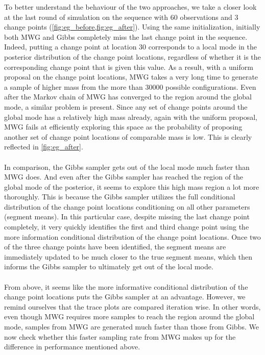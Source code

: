 To better understand the behaviour of the two approaches, we take a closer look at the last round of simulation on the sequence with $60$ observations and $3$ change points (\cref{fig:eg_before,fig:eg_after}). Using the same initialization, initially both MWG and Gibbs completely miss the last change point in the sequence. Indeed, putting a change point at location $30$ corresponds to a local mode in the posterior distribution of the change point locations, regardless of whether it is the corresponding change point that is given this value. As a result, with a uniform proposal on the change point locations, MWG takes a very long time to generate a sample of higher mass from the more than $30000$ possible configurations. Even after the Markov chain of MWG has converged to the region around the global mode, a similar problem is present. Since any set of change points around the global mode has a relatively high mass already, again with the uniform proposal, MWG fails at efficiently exploring this space as the probability of proposing another set of change point locations of comparable mass is low. This is clearly reflected in \cref{fig:eg_after}.\\\\
In comparison, the Gibbs sampler gets out of the local mode much faster than MWG does. And even after the Gibbs sampler has reached the region of the global mode of the posterior, it seems to explore this high mass region a lot more thoroughly. This is because the Gibbs sampler utilizes the full conditional distribution of the change point locations conditioning on all other parameters (segment means). In this particular case, despite missing the last change point completely, it very quickly identifies the first and third change point using the more information conditional distribution of the change point locations. Once two of the three change points have been identified, the segment means are immediately updated to be much closer to the true segment means, which then informs the Gibbs sampler to ultimately get out of the local mode.\\\\
From above, it seems like the more informative conditional distribution of the change point locations puts the Gibbs sampler at an advantage. However, we remind ourselves that the trace plots are compared iteration wise. In other words, even though MWG requires more samples to reach the region around the global mode, samples from MWG are generated much faster than those from Gibbs. We now check whether this faster sampling rate from MWG makes up for the difference in performance mentioned above.\\\\


